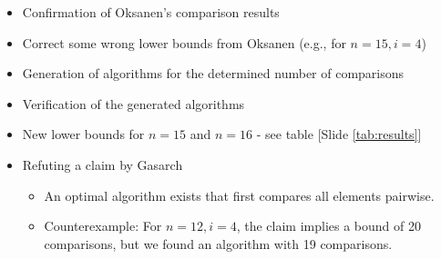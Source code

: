 \begin{frame}{\insertsection}
  \begin{itemize}
    \item<+-> Confirmation of Oksanen's comparison results
    \item<+-> Correct some wrong lower bounds from Oksanen (e.g., for $n=15, i=4$) %
    \item<+-> Generation of algorithms for the determined number of comparisons
    \item<+-> Verification of the generated algorithms
    \item<+-> New lower bounds for $n=15$ and $n=16$ - see table [Slide \ref{tab:results}]
    \item<+-> Refuting a claim by Gasarch
          \begin{itemize}
            \item An optimal algorithm exists that first compares all elements pairwise.
            \item Counterexample: For $n = 12, i = 4$, the claim implies a bound of 20
                  comparisons, but we found an algorithm with 19 comparisons.
          \end{itemize}
  \end{itemize}
\end{frame}

